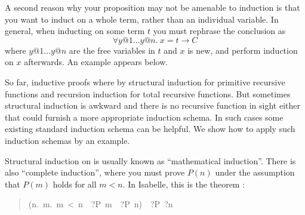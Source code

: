 \begin{isabelle}
\begin{isamarkuptext}
A second reason why your proposition may not be amenable to induction is that
you want to induct on a whole term, rather than an individual variable. In
general, when inducting on some term $t$ you must rephrase the conclusion as
\[ \forall y@1 \dots y@n.~ x = t \longrightarrow C \] where $y@1 \dots y@n$
are the free variables in $t$ and $x$ is new, and perform induction on $x$
afterwards. An example appears below.%
\end{isamarkuptext}%
%
%
\begin{isamarkuptext}%
So far, inductive proofs where by structural induction for
primitive recursive functions and recursion induction for total recursive
functions. But sometimes structural induction is awkward and there is no
recursive function in sight either that could furnish a more appropriate
induction schema. In such cases some existing standard induction schema can
be helpful. We show how to apply such induction schemas by an example.

Structural induction on  is
usually known as ``mathematical induction''. There is also ``complete
induction'', where you must prove $P(n)$ under the assumption that $P(m)$
holds for all $m<n$. In Isabelle, this is the theorem :
\begin{quote}

\begin{isabelle}%
({\isasymAnd}\mbox{n}.\ {\isasymforall}\mbox{m}.\ \mbox{m}\ <\ \mbox{n}\ {\isasymlongrightarrow}\ \mbox{?P}\ \mbox{m}\ {\isasymLongrightarrow}\ \mbox{?P}\ \mbox{n})\ {\isasymLongrightarrow}\ \mbox{?P}\ \mbox{?n}
\end{isabelle}%


\end{quote}
\end{isamarkuptext}
\end{isabelle}
